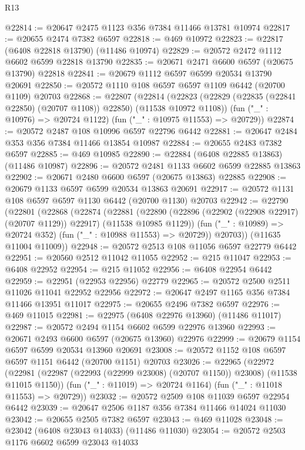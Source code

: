 \begin{lexlean}{R13}
\begin{coremodule}
@22814 := @20647 @2475 @1123 @356 @7384 @11466 @13781 @10974
@22817 := @20655 @2474 @7382 @6597
@22818 := @469 @10972
@22823 := @22817 (@6408 @22818 @13790) (@11486 @10974)
@22829 := @20572 @2472 @1112 @6602 @6599 @22818 @13790
@22835 := @20671 @2471 @6600 @6597 (@20675 @13790) @22818
@22841 := @20679 @1112 @6597 @6599 @20534 @13790 @20691
@22850 := @20572 @1110 @108 @6597 @6597 @1109 @6442 (@20700 @1109) @20703
@22868 := @22807
    (@22814
      (@22823 (@22829 (@22835 (@22841 @22850) (@20707 @1108)) @22850) (@11538 @10972 @1108))
      (fun ("_" : @10976) => @20724 @1122)
      (fun ("_" : @10975 @11553) => @20729))
@22874 := @20572 @2487 @108 @10996 @6597 @22796 @6442
@22881 := @20647 @2484 @353 @356 @7384 @11466 @13854 @10987
@22884 := @20655 @2483 @7382 @6597
@22885 := @469 @10985
@22890 := @22884 (@6408 @22885 @13863) (@11486 @10987)
@22896 := @20572 @2481 @1133 @6602 @6599 @22885 @13863
@22902 := @20671 @2480 @6600 @6597 (@20675 @13863) @22885
@22908 := @20679 @1133 @6597 @6599 @20534 @13863 @20691
@22917 := @20572 @1131 @108 @6597 @6597 @1130 @6442 (@20700 @1130) @20703
@22942 := @22790
    (@22801
      (@22868
        (@22874
          (@22881
            (@22890 (@22896 (@22902 (@22908 @22917) (@20707 @1129)) @22917) (@11538 @10985 @1129))
            (fun ("_" : @10989) => @20724 @352)
            (fun ("_" : @10988 @11553) => @20729))
          @20703))
      (@11635 @11004 @11009))
@22948 := @20572 @2513 @108 @11056 @6597 @22779 @6442
@22951 := @20560 @2512 @11042 @11055
@22952 := @215 @11047
@22953 := @6408 @22952
@22954 := @215 @11052
@22956 := @6408 @22954 @6442
@22959 := @22951 (@22953 @22956) @22779
@22965 := @20572 @2500 @2511 @11026 @11041 @22952 @22956
@22972 := @20647 @2497 @1165 @356 @7384 @11466 @13951 @11017
@22975 := @20655 @2496 @7382 @6597
@22976 := @469 @11015
@22981 := @22975 (@6408 @22976 @13960) (@11486 @11017)
@22987 := @20572 @2494 @1154 @6602 @6599 @22976 @13960
@22993 := @20671 @2493 @6600 @6597 (@20675 @13960) @22976
@22999 := @20679 @1154 @6597 @6599 @20534 @13960 @20691
@23008 := @20572 @1152 @108 @6597 @6597 @1151 @6442 (@20700 @1151) @20703
@23026 := @22965
    (@22972
      (@22981 (@22987 (@22993 (@22999 @23008) (@20707 @1150)) @23008) (@11538 @11015 @1150))
      (fun ("_" : @11019) => @20724 @1164)
      (fun ("_" : @11018 @11553) => @20729))
@23032 := @20572 @2509 @108 @11039 @6597 @22954 @6442
@23039 := @20647 @2506 @1187 @356 @7384 @11466 @14024 @11030
@23042 := @20655 @2505 @7382 @6597
@23043 := @469 @11028
@23048 := @23042 (@6408 @23043 @14033) (@11486 @11030)
@23054 := @20572 @2503 @1176 @6602 @6599 @23043 @14033

\end{coremodule}
\end{lexlean}
